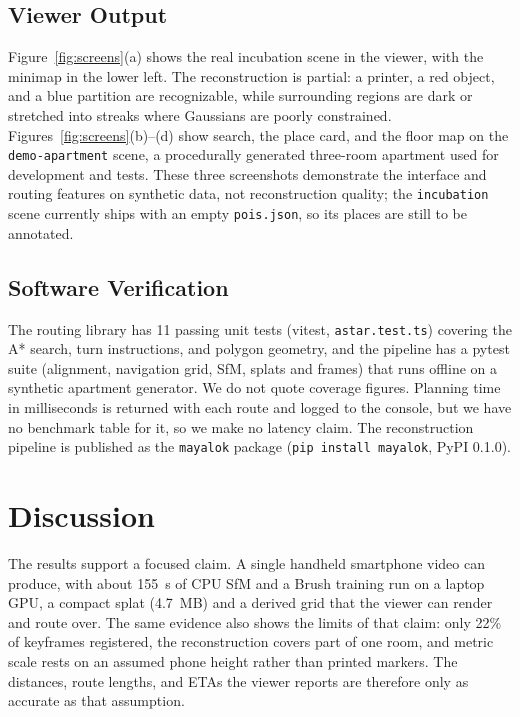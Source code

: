 \documentclass[conference]{IEEEtran}
\begin{document}
\subsection{Viewer Output}
Figure~\ref{fig:screens}(a) shows the real incubation scene in the viewer, with the minimap in the lower left. The reconstruction is partial: a printer, a red object, and a blue partition are recognizable, while surrounding regions are dark or stretched into streaks where Gaussians are poorly constrained. Figures~\ref{fig:screens}(b)--(d) show search, the place card, and the floor map on the \texttt{demo-apartment} scene, a procedurally generated three-room apartment used for development and tests. These three screenshots demonstrate the interface and routing features on synthetic data, not reconstruction quality; the \texttt{incubation} scene currently ships with an empty \texttt{pois.json}, so its places are still to be annotated.

\subsection{Software Verification}
The routing library has 11 passing unit tests (vitest, \texttt{astar.test.ts}) covering the A* search, turn instructions, and polygon geometry, and the pipeline has a pytest suite (alignment, navigation grid, SfM, splats and frames) that runs offline on a synthetic apartment generator. We do not quote coverage figures. Planning time in milliseconds is returned with each route and logged to the console, but we have no benchmark table for it, so we make no latency claim. The reconstruction pipeline is published as the \texttt{mayalok} package (\texttt{pip install mayalok}, PyPI 0.1.0).

\FloatBarrier

\section{Discussion}
The results support a focused claim. A single handheld smartphone video can produce, with about 155~s of CPU SfM and a Brush training run on a laptop GPU, a compact splat (4.7~MB) and a derived grid that the viewer can render and route over. The same evidence also shows the limits of that claim: only 22\% of keyframes registered, the reconstruction covers part of one room, and metric scale rests on an assumed phone height rather than printed markers. The distances, route lengths, and ETAs the viewer reports are therefore only as accurate as that assumption.
\end{document}
